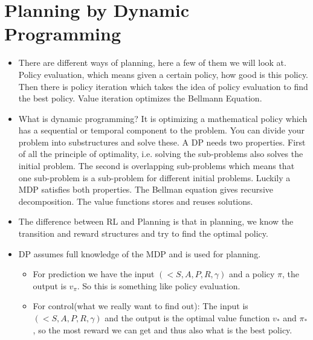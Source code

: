 \documentclass[a4paper]{article}
\begin{document}
\section{Planning by Dynamic Programming}
\begin{itemize}
    \item There are different ways of planning, here a few of them we will look at. Policy evaluation, which means given a certain policy, how good is this policy. Then there is policy iteration which takes the idea of policy evaluation to find the best policy. Value iteration optimizes the Bellmann Equation.  
    \item What is dynamic programming? It is optimizing a mathematical policy which has a sequential or temporal component to the problem. You can divide your problem into substructures and solve these. A DP needs two properties. First of all the principle of optimality, i.e. solving the sub-problems also solves the initial problem. The second is overlapping sub-problems which means that one sub-problem is a sub-problem for different initial problems. 
    \newline
    Luckily a MDP satisfies both properties. The Bellman equation gives recursive decomposition. The value functions stores and reuses solutions. 
    \item The difference between RL and Planning is that in planning, we know the transition and reward structures and try to find the optimal policy.
    \item DP assumes full knowledge of the MDP and is used for planning.
    \begin{itemize}
        \item For prediction we have the input $(<S,A,P,R,\gamma)$ and a policy $\pi$, the output is $v_{\pi}$. So this is something like policy evaluation.
        \item For control(what we really want to find out): 
        The input is  $(<S,A,P,R,\gamma)$ and the output is the optimal value function $v_*$ and $\pi_*$, so the most reward we can get and thus also what is the best policy. 
    \end{itemize}
\end{itemize}
\end{document}

